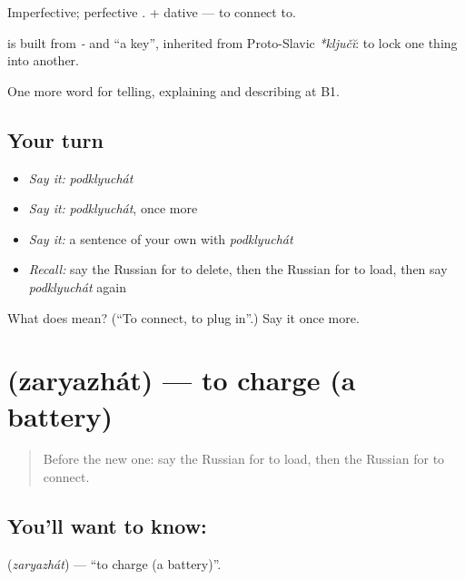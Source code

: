 Imperfective; perfective \emph{}. \emph{ } + dative — to connect to.

\begin{cousinweb}
\textbf{} is built from \emph{-} and \emph{} \textquotedblleft{}a key\textquotedblright{}, inherited from Proto-Slavic \emph{*ključĭ}: to lock one thing into another.
\end{cousinweb}

\begin{grammarlens}[title={What you've built}]
One more word for telling, explaining and describing at B1.
\end{grammarlens}

\subsection*{Your turn}
\begin{itemize}
\raggedright
  \item \emph{Say it:} \emph{podklyuchát}
  \item \emph{Say it:} \emph{podklyuchát}, once more
  \item \emph{Say it:} a sentence of your own with \emph{podklyuchát}
  \item \emph{Recall:} say the Russian for to delete, then the Russian for to load, then say \emph{podklyuchát} again
\end{itemize}

\begin{tcolorbox}[breakable,colback=teal!4,colframe=teal!35!black,title={Before you move on}]
What does  mean? (\textquotedblleft{}To connect, to plug in\textquotedblright{}.) Say it once more.
\end{tcolorbox}
\section[\texorpdfstring{\ru{заряжать} (zaryazhát)}{заряжать (zaryazhát)}]{ (zaryazhát) — to charge (a battery)}

\label{lesson:RU-C402-zaryazhat}



\begin{quote}
Before the new one: say the Russian for to load, then the Russian for to connect.
\end{quote}

\subsection*{You'll want to know: }
\textbf{} (\emph{zaryazhát}) — \textquotedblleft{}to charge (a battery)\textquotedblright{}.

